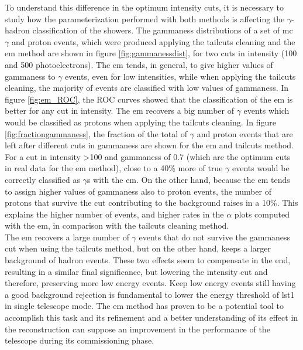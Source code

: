 \documentclass[main.tex]{subfiles}
\begin{document}
To understand this difference in the optimum intensity cuts, it is necessary to study how the parameterization performed with both methods is affecting the $\gamma$-hadron classification of the showers. The gammaness distributions of a set of \gls{mc} $\gamma$ and proton events, which were produced applying the tailcuts cleaning and the \gls{em} method are shown in figure \ref{fig:gammanessdist}, for two cuts in intensity (100 and 500 photoelectrons). The \gls{em} tends, in general, to give higher values of gammaness to $\gamma$ events, even for low intensities, while when applying the tailcuts cleaning, the majority of events are classified with low values of gammaness. In figure \ref{fig:em_ROC}, the ROC curves showed that the classification of the \gls{em} is better for any cut in intensity. The \gls{em} recovers a big number of $\gamma$ events which would be classified as protons when applying the tailcuts cleaning. In figure \ref{fig:fractiongammaness}, the fraction of the total of $\gamma$ and proton events that are left after different cuts in gammaness are shown for the \gls{em} and tailcuts method. For a cut in intensity >100 and gammaness of 0.7 (which are the optimum cuts in real data for the \gls{em} method), close to a 40\% more of true $\gamma$ events would be correctly classified as $\gamma$s with the \gls{em}. On the other hand, because the \gls{em} tends to assign higher values of gammaness also to proton events, the number of protons that survive the cut contributing to the background raises in a 10\%. This explains the higher number of events, and higher rates in the $\alpha$ plots computed with the \gls{em}, in comparison with the tailcuts cleaning method.\\
The \gls{em} recovers a large number of $\gamma$ events that do not survive the gammaness cut when using the tailcuts method, but on the other hand, keeps a larger background of hadron events. These two effects seem to compensate in the end, resulting in a similar final significance, but lowering the intensity cut and therefore, preserving more low energy events.
Keep low energy events still having a good background rejection is fundamental to lower the energy threshold of \gls{lst}1 in single telescope mode. The \gls{em} method has proven to be a potential tool to accomplish this task and its refinement and a better understanding of its effect in the reconstruction can suppose an improvement in the performance of the telescope during its commissioning phase.
\end{document}
